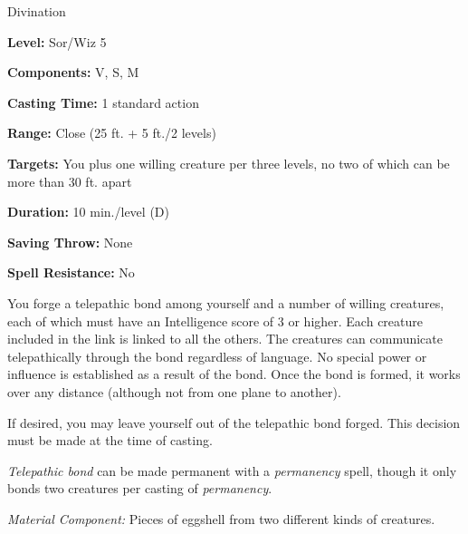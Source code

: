 
Divination

\textbf{Level:} Sor/Wiz 5

\textbf{Components:} V, S, M

\textbf{Casting Time:} 1 standard action

\textbf{Range:} Close (25 ft. + 5 ft./2 levels)

\textbf{Targets:} You plus one willing creature per three levels, no two of which 
can be more than 30 ft. apart

\textbf{Duration:} 10 min./level (D)

\textbf{Saving Throw:} None

\textbf{Spell Resistance:} No

You forge a telepathic bond among yourself and a number of willing creatures, each 
of which must have an Intelligence score of 3 or higher. Each creature included 
in the link is linked to all the others. The creatures can communicate telepathically 
through the bond regardless of language. No special power or influence is established 
as a result of the bond. Once the bond is formed, it works over any distance (although 
not from one plane to another).

If desired, you may leave yourself out of the telepathic bond forged. This decision 
must be made at the time of casting.

\textit{Telepathic bond} can be made permanent with a \textit{permanency} spell, 
though it only bonds two creatures per casting of \textit{permanency}.

\textit{Material Component:} Pieces of eggshell from two different kinds of creatures.

